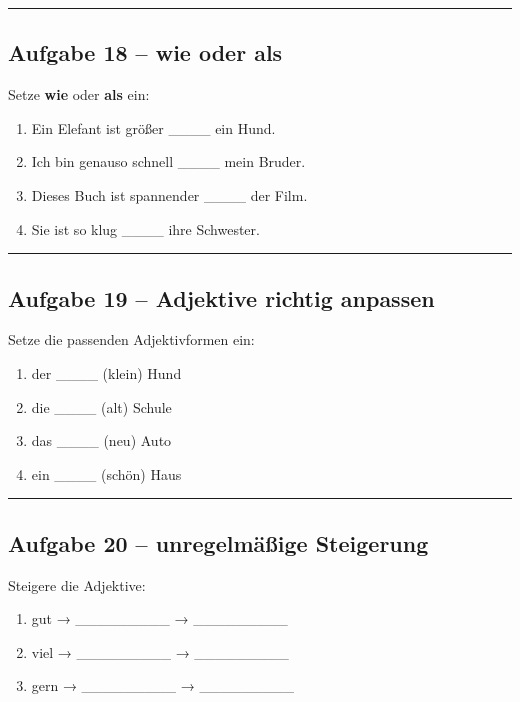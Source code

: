 \documentclass[a4paper,12pt]{article}
\newcommand{\linie}{\vspace{4pt}\hrule\vspace{10pt}}
\begin{document}
\linie

\subsection*{Aufgabe 18 – wie oder als}

Setze \textbf{wie} oder \textbf{als} ein:

\begin{enumerate}
\item Ein Elefant ist größer \_\_\_\_ ein Hund.
\item Ich bin genauso schnell \_\_\_\_ mein Bruder.
\item Dieses Buch ist spannender \_\_\_\_ der Film.
\item Sie ist so klug \_\_\_\_ ihre Schwester.
\end{enumerate}

\linie

\subsection*{Aufgabe 19 – Adjektive richtig anpassen}

Setze die passenden Adjektivformen ein:

\begin{enumerate}
\item der \_\_\_\_ (klein) Hund
\item die \_\_\_\_ (alt) Schule
\item das \_\_\_\_ (neu) Auto
\item ein \_\_\_\_ (schön) Haus
\end{enumerate}

\linie

\subsection*{Aufgabe 20 – unregelmäßige Steigerung}

Steigere die Adjektive:

\begin{enumerate}
\item gut → \_\_\_\_\_\_\_\_\_ → \_\_\_\_\_\_\_\_\_
\item viel → \_\_\_\_\_\_\_\_\_ → \_\_\_\_\_\_\_\_\_
\item gern → \_\_\_\_\_\_\_\_\_ → \_\_\_\_\_\_\_\_\_
\end{enumerate}
\end{document}
